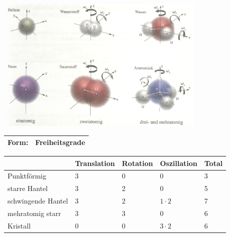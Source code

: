 		\newline
		\newline
		\newline
		\newline
		\begin{minipage}[t]{18cm}
			\vspace{-\ht\strutbox}\includegraphics[width=10cm]{./bilder/FreiheitsgradeMolekuel.png}
		\end{minipage}
		\newline
		\newline
		\newline
		\newline
		\begin{minipage}{19cm}
			\renewcommand{\arraystretch}{1.5}
			\begin{tabular}{ | p{3cm} | p{13.28cm} |}
				\hline
				\textbf{Form:} & \textbf{Freiheitsgrade}\\
				\hline
			\end{tabular}
			\begin{tabular}{ | p{3cm} | p{3cm} | p{3cm} | p{3cm} | p{3cm} |}
				& Translation & Rotation & Oszillation & Total\\
				\hline
				Punktförmig & 3 & 0 & 0 & 3\\
				starre Hantel & 3 & 2 & 0 & 5\\
				schwingende Hantel & 3 & 2 & $1 \cdot 2$ & 7\\
				mehratomig starr & 3 & 3 & 0 & 6\\
				Kristall & 0 & 0 & $3 \cdot 2$ & 6\\
				\hline
			\end{tabular}
			\renewcommand{\arraystretch}{1}
			\vspace{3cm}
		\end{minipage}
		\newline
